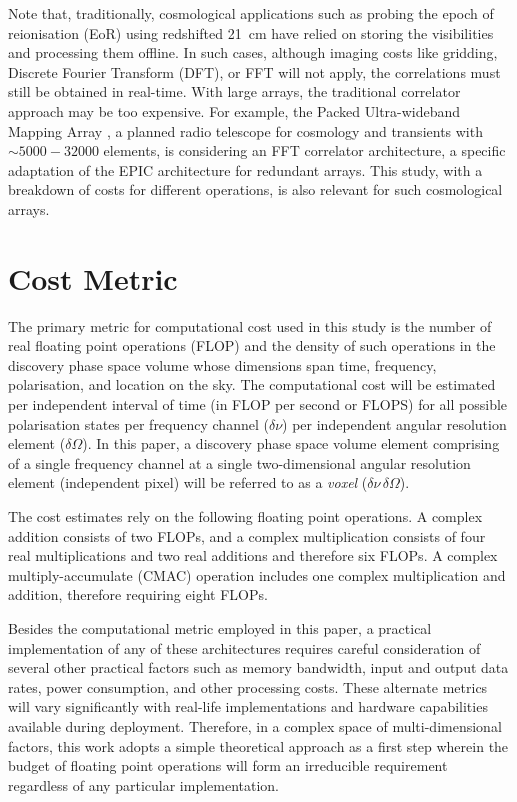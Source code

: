 \documentclass[
  journal=pasa,
  manuscript=article-type,
  year=2020,
  volume=37,
]{cup-journal}
\begin{document}
Note that, traditionally, cosmological applications such as probing the epoch of reionisation (EoR) using redshifted 21~cm have relied on storing the visibilities and processing them offline. In such cases, although imaging costs like gridding, Discrete Fourier Transform (DFT), or FFT will not apply, the correlations must still be obtained in real-time. With large arrays, the traditional correlator approach may be too expensive. For example, the Packed Ultra-wideband Mapping Array \citep[PUMA;][]{PUMA+2019}, a planned radio telescope for cosmology and transients with $\sim 5000-32000$ elements, is considering an FFT correlator architecture, a specific adaptation of the EPIC architecture for redundant arrays. This study, with a breakdown of costs for different operations, is also relevant for such cosmological arrays.

\section{Cost Metric} \label{sec:computational-cost}

The primary metric for computational cost used in this study is the number of real floating point operations (FLOP) and the density of such operations in the discovery phase space volume whose dimensions span time, frequency, polarisation, and location on the sky. The computational cost will be estimated per independent interval of time (in FLOP per second or FLOPS) for all possible polarisation states per frequency channel ($\delta\nu$) per independent angular resolution element ($\delta\Omega$). In this paper, a discovery phase space volume element comprising of a single frequency channel at a single two-dimensional angular resolution element (independent pixel) will be referred to as a \textit{voxel} ($\delta\nu\,\delta\Omega$).

The cost estimates rely on the following floating point operations. A complex addition consists of two FLOPs, and a complex multiplication consists of four real multiplications and two real additions and therefore six FLOPs. A complex multiply-accumulate (CMAC) operation includes one complex multiplication and addition, therefore requiring eight FLOPs.

Besides the computational metric employed in this paper, a practical implementation of any of these architectures requires careful consideration of several other practical factors such as memory bandwidth, input and output data rates, power consumption, and other processing costs. These alternate metrics will vary significantly with real-life implementations and hardware capabilities available during deployment. Therefore, in a complex space of multi-dimensional factors, this work adopts a simple theoretical approach as a first step wherein the budget of floating point operations will form an irreducible requirement regardless of any particular implementation. 
\end{document}

